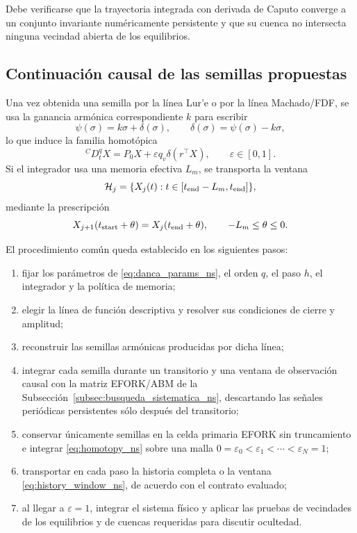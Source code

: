 \documentclass[journal]{IEEEtran}
\begin{document}
Debe verificarse que la trayectoria integrada con derivada de Caputo converge
a un conjunto invariante numéricamente persistente y que su cuenca no
intersecta ninguna vecindad abierta de los equilibrios. 

\subsection{Continuación causal de las semillas propuestas}

Una vez obtenida una semilla por la línea Lur'e o por la línea Machado/FDF, se
usa la ganancia armónica correspondiente \(k\) para escribir
\begin{equation}
\label{eq:delta_ns}
\psi(\sigma)=k\sigma+\delta(\sigma),
\qquad
\delta(\sigma)=\psi(\sigma)-k\sigma,
\end{equation}
lo que induce la familia homotópica
\begin{equation}
\label{eq:homotopy_ns}
{}^{C}D_t^qX=P_0X+\varepsilon q_v\delta(r^\top X),
\qquad \varepsilon\in[0,1].
\end{equation}
Si el integrador usa una memoria efectiva $L_m$, se transporta la ventana
\begin{equation}
\label{eq:history_window_ns}
\mathcal H_j=\{X_j(t):t\in[t_{\rm end}-L_m,t_{\rm end}]\},
\end{equation}
mediante la prescripción
\begin{equation}
\label{eq:history_transfer_ns}
X_{j+1}(t_{\rm start}+\theta)=X_j(t_{\rm end}+\theta),
\qquad -L_m\leq\theta\leq0.
\end{equation}

El procedimiento común queda establecido en los siguientes pasos:
\begin{enumerate}[leftmargin=1.8em,label=\arabic*)]
\item fijar los parámetros de \eqref{eq:danca_params_ns}, el orden $q$, el paso $h$, el integrador y la política de memoria;
\item elegir la línea de función descriptiva y resolver sus condiciones de cierre y amplitud;
\item reconstruir las semillas armónicas producidas por dicha línea;
\item integrar cada semilla durante un transitorio y una ventana de observación causal con la matriz EFORK/ABM de la Subsección~\ref{subsec:busqueda_sistematica_ns}, descartando las señales periódicas persistentes sólo después del transitorio;
\item conservar únicamente semillas  en la celda primaria EFORK sin truncamiento e integrar \eqref{eq:homotopy_ns} sobre una malla $0=\varepsilon_0<\varepsilon_1<\cdots<\varepsilon_N=1$;
\item transportar en cada paso la historia completa o la ventana \eqref{eq:history_window_ns}, de acuerdo con el contrato evaluado;
\item al llegar a $\varepsilon=1$, integrar el sistema físico y aplicar las pruebas de vecindades de los equilibrios y de cuencas requeridas para discutir ocultedad.
\end{enumerate}
\end{document}
